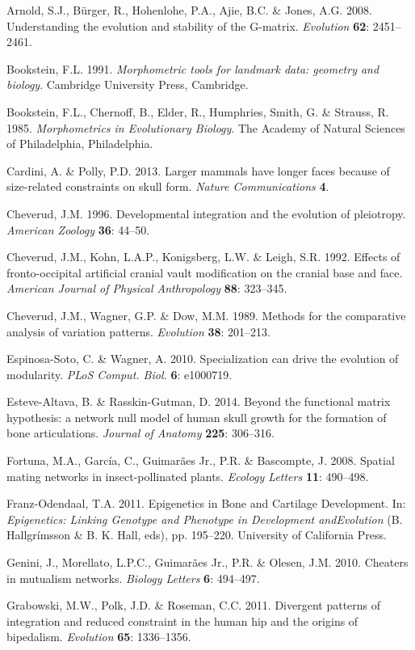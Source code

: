 \documentclass[12pt,]{article}
\begin{document}
Arnold, S.J., Bürger, R., Hohenlohe, P.A., Ajie, B.C. \& Jones, A.G.
2008. Understanding the evolution and stability of the G-matrix.
\emph{Evolution} \textbf{62}: 2451--2461.

Bookstein, F.L. 1991. \emph{Morphometric tools for landmark data:
geometry and biology}. Cambridge University Press, Cambridge.

Bookstein, F.L., Chernoff, B., Elder, R., Humphries, Smith, G. \&
Strauss, R. 1985. \emph{Morphometrics in Evolutionary Biology}. The
Academy of Natural Sciences of Philadelphia, Philadelphia.

Cardini, A. \& Polly, P.D. 2013. Larger mammals have longer faces
because of size-related constraints on skull form. \emph{Nature
Communications} \textbf{4}.

Cheverud, J.M. 1996. Developmental integration and the evolution of
pleiotropy. \emph{American Zoology} \textbf{36}: 44--50.

Cheverud, J.M., Kohn, L.A.P., Konigsberg, L.W. \& Leigh, S.R. 1992.
Effects of fronto-occipital artificial cranial vault modification on the
cranial base and face. \emph{American Journal of Physical Anthropology}
\textbf{88}: 323--345.

Cheverud, J.M., Wagner, G.P. \& Dow, M.M. 1989. Methods for the
comparative analysis of variation patterns. \emph{Evolution}
\textbf{38}: 201--213.

Espinosa-Soto, C. \& Wagner, A. 2010. Specialization can drive the
evolution of modularity. \emph{PLoS Comput. Biol.} \textbf{6}: e1000719.

Esteve-Altava, B. \& Rasskin-Gutman, D. 2014. Beyond the functional
matrix hypothesis: a network null model of human skull growth for the
formation of bone articulations. \emph{Journal of Anatomy} \textbf{225}:
306--316.

Fortuna, M.A., García, C., Guimarães Jr., P.R. \& Bascompte, J. 2008.
Spatial mating networks in insect-pollinated plants. \emph{Ecology
Letters} \textbf{11}: 490--498.

Franz-Odendaal, T.A. 2011. Epigenetics in Bone and Cartilage
Development. In: \emph{Epigenetics: Linking Genotype and Phenotype in
Development andEvolution} (B. Hallgrímsson \& B. K. Hall, eds), pp.
195--220. University of California Press.

Genini, J., Morellato, L.P.C., Guimarães Jr., P.R. \& Olesen, J.M. 2010.
Cheaters in mutualism networks. \emph{Biology Letters} \textbf{6}:
494--497.

Grabowski, M.W., Polk, J.D. \& Roseman, C.C. 2011. Divergent patterns of
integration and reduced constraint in the human hip and the origins of
bipedalism. \emph{Evolution} \textbf{65}: 1336--1356.
\end{document}
